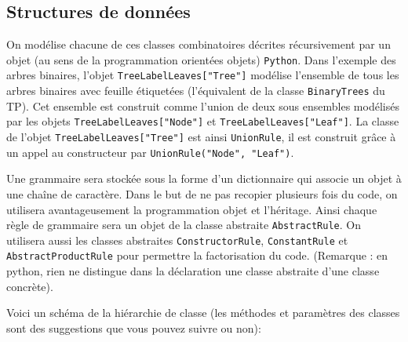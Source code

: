 \documentclass[11pt]{article}
\newcommand{\Python}{\texttt{Python}\xspace}
\newcommand{\AbstractRule}{\texttt{AbstractRule}\xspace}
\newcommand{\ConstructorRule}{\texttt{ConstructorRule}\xspace}
\newcommand{\ConstantRule}{\texttt{ConstantRule}\xspace}
\newcommand{\AbstractProductRule}{\texttt{AbstractProductRule}\xspace}
\newcommand{\UnionRule}{\texttt{UnionRule}\xspace}
\begin{document}
\subsection{Structures de données}

On modélise chacune de ces classes combinatoires décrites récursivement par un
objet (au sens de la programmation orientées objets) \Python. Dans l'exemple
des arbres binaires, l'objet \texttt{TreeLabelLeaves["Tree"]} modélise l'ensemble de
tous les arbres binaires avec feuille étiquetées (l'équivalent de la classe 
\texttt{BinaryTrees} du TP).
Cet ensemble est construit comme l'union de deux sous ensembles modélisés par
les objets \texttt{TreeLabelLeaves["Node"]} et \texttt{TreeLabelLeaves["Leaf"]}.
La classe de l'objet \texttt{TreeLabelLeaves["Tree"]} est
ainsi \UnionRule, il est construit grâce à un appel au constructeur par
\texttt{UnionRule("Node", "Leaf")}.


Une grammaire sera stockée sous la forme d'un dictionnaire qui associe un
objet à une chaîne de caractère. Dans le but de ne pas recopier plusieurs fois
du code, on utilisera avantageusement la programmation objet et
l'héritage. Ainsi chaque règle de grammaire sera un objet de la classe
abstraite \AbstractRule. On utilisera aussi les classes abstraites
\ConstructorRule, \ConstantRule et \AbstractProductRule
pour permettre la factorisation du code. (Remarque : en python, rien
ne distingue dans la déclaration une classe abstraite d'une classe concrète).
\pagebreak

Voici un schéma de la hiérarchie de classe (les méthodes et paramètres des
classes sont des suggestions que vous pouvez suivre ou non): \bigskip
\end{document}
